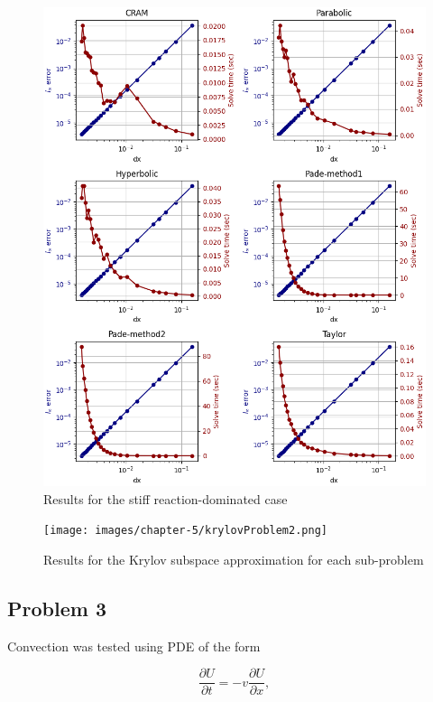 \begin{figure}[p]
    \centering
    \includegraphics[width=5.0in]{images/chapter-5/stiff_reaction_dominated.png}
    \caption{Results for the stiff reaction-dominated case}
    \label{fig:problem2_stiff_reaction_dom}
\end{figure}

\clearpage

\begin{figure}
    \centering
    \texttt{[image: images/chapter-5/krylovProblem2.png]}
    \caption{Results for the Krylov subspace approximation for each sub-problem}
    \label{fig:problem2_krylov}
\end{figure}

\clearpage

\subsection{Problem 3}

Convection was tested using PDE of the form

\begin{equation}
    \frac{\partial U}{\partial t} = -v\frac{\partial U}{\partial x},
    \label{eq:convection_PDE}
\end{equation}

